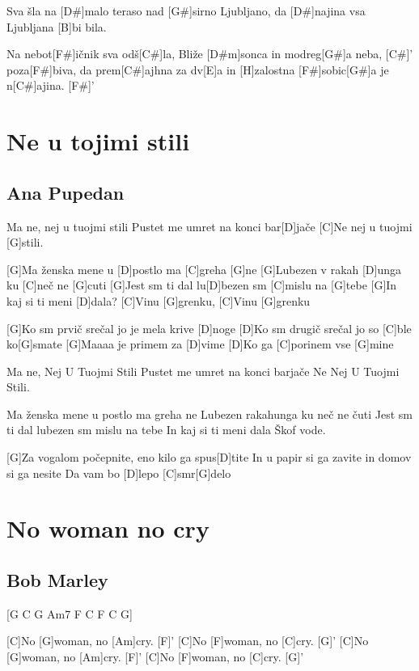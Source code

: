 \documentclass[a4paper,12pt]{article}
\begin{document}
\begin{multicols}{2}
\begin{guitar}
Sva šla na [D#]malo teraso 
nad [G#]sirno Ljubljano,
da [D#]najina vsa Ljubljana [B]bi bila.


Na nebot[F#]ičnik sva odš[C#]la,
Bliže [D#m]sonca in modreg[G#]a neba, [C#]'
poza[F#]biva, da prem[C#]ajhna za dv[E]a 
in [H]zalostna [F#]sobic[G#]a je n[C#]ajina. [F#]'

\end{guitar}
\section{Ne u tojimi stili}
\subsection*{Ana Pupedan}
\begin{guitar}
[G]Ma ne, nej u tuojmi stili
Pustet me umret na konci bar[D]jače
[C]Ne nej u tuojmi [G]stili.


[G]Ma ženska mene u [D]postlo ma [C]greha [G]ne
[G]Lubezen v rakah [D]unga ku [C]neč ne [G]cuti
[G]Jest sm ti dal lu[D]bezen sm [C]mislu na [G]tebe
[G]In kaj si ti meni [D]dala?
[C]Vinu [G]grenku, [C]Vinu [G]grenku


[G]Ko sm prvič srečal jo je mela krive [D]noge
[D]Ko sm drugič srečal jo so [C]ble ko[G]smate
[G]Maaaa je primem za [D]vime
[D]Ko ga [C]porinem vse [G]mine


Ma ne, Nej U Tuojmi Stili
Pustet me umret na konci barjače
Ne Nej U Tuojmi Stili.


Ma ženska mene u postlo ma greha ne
Lubezen rakahunga ku neč ne čuti
Jest sm ti dal lubezen sm mislu na tebe
In kaj si ti meni dala
Škof vode.


[G]Za vogalom počepnite, eno kilo ga spus[D]tite
In u papir si ga zavite in domov si ga nesite
Da vam bo [D]lepo [C]smr[G]delo

\end{guitar}
\section{No woman no cry}
\subsection*{Bob Marley}
\begin{guitar}

[G  C  G  Am7  F  C  F  C  G]


[C]No [G]woman, no [Am]cry. [F]'
[C]No [F]woman, no [C]cry.  [G]'
[C]No [G]woman, no [Am]cry. [F]'
[C]No [F]woman, no [C]cry. [G]'



\end{guitar}
\end{multicols}
\end{document}
